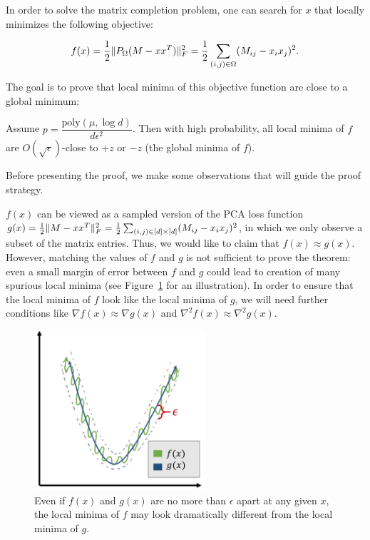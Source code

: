 In order to solve the matrix completion problem, one can search for $x$ that locally minimizes the following objective:

\begin{equation}
f(x) = \frac{1}{2}\|P_\Omega(M-xx^T)\|_F^2 = \frac{1}{2} \sum_{(i,j) \in \Omega} (M_{ij} - x_ix_j)^2.
\end{equation}

The goal is to prove that local minima of this objective function are close to a global minimum:

\begin{theorem}\label{lec11:thm:matrix-completion}
Assume $p = \dfrac{\textrm{poly}(\mu, \log d)}{d\epsilon^2}$. Then with high probability, all local minima of $f$ are $O(\sqrt{\epsilon})$-close to $+z$ or $-z$ (the global minima of $f$).
\end{theorem}

Before presenting the proof, we make some observations that will guide the proof strategy.

\begin{remark}
$f(x)$ can be viewed as a sampled version of the PCA loss function $g(x) = \frac{1}{2}\|M - xx^T\|_F^2 = \frac{1}{2}\sum_{(i,j) \in [d]\times[d]} (M_{ij} - x_ix_j)^2$, in which we only observe a subset of the matrix entries. Thus, we would like to claim that $f(x) \approx g(x)$. However, matching the values of $f$ and $g$ is not sufficient to prove the theorem: even a small margin of error between $f$ and $g$ could lead to creation of many spurious local minima (see Figure~\ref{lec11:fig:matrix_completion_f_g} for an illustration). In order to ensure that the local minima of $f$ look like the local minima of $g$, we will need further conditions like $\nabla f(x) \approx \nabla g(x)$ and $\nabla^2 f(x) \approx \nabla^2 g(x)$.
\end{remark}

\begin{figure}
    \centering
    \includegraphics[width=2.5in]{figures/matrix-completion-f-g.png}
    \caption{Even if $f(x)$ and $g(x)$ are no more than $\epsilon$ apart at any given $x$, the local minima of $f$ may look dramatically different from the local minima of $g$.}
    \label{lec11:fig:matrix_completion_f_g}
\end{figure}

